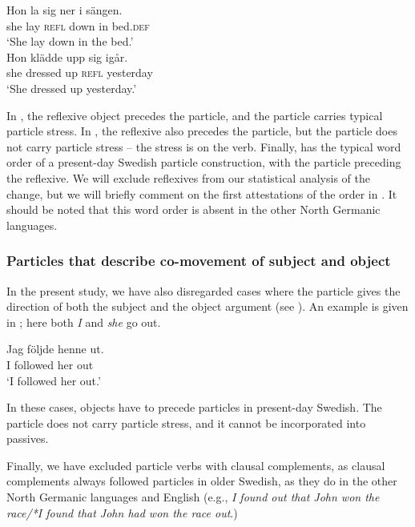 \documentclass[output=paper]{langscibook}
\begin{document}
\ex\label{ex:lalu:19b}
\gll  Hon   la     sig ner     i   sängen.\\
    she     lay   \textsc{refl}   down   in   bed.\textsc{def}\\
  \glt `She lay down in the bed.’ \\
\ex\label{ex:lalu:19c}
\gll Hon   klädde   upp   sig   igår. \\
    she     dressed   up   \textsc{refl}   yesterday\\
\glt `She dressed up yesterday.’\\
\z
\z


In , the reflexive object precedes the particle, and the particle carries typical particle stress. In , the reflexive also precedes the particle, but the particle does not carry particle stress – the stress is on the verb. Finally,  has the typical word order of a present-day Swedish particle construction, with the particle preceding the reflexive. We will exclude reflexives from our statistical analysis of the change, but we will briefly comment on the first attestations of the order in . It should be noted that this word order is absent in the other North Germanic languages.



\subsubsection{Particles that describe co-movement of subject and object} 
In the present study, we have also disregarded cases where the particle gives the direction of both the subject and the object argument (see \citealt{Toivonen2003}). An example is given in ; here both \textit{I} and \textit{she} go out.


\ea\label{ex:lalu:20}
\gll  Jag     följde     henne   ut.\\
I         followed   her     out\\
\glt `I followed her out.'
\z


In these cases, objects have to precede particles in present-day Swedish. The particle does not carry particle stress, and it cannot be incorporated into passives.



Finally, we have excluded particle verbs with clausal complements, as clausal complements always followed particles in older Swedish, as they do in the other North Germanic languages and English (e.g., \textit{I found out that John won the race/*I found that John had won the race out}.)
\end{document}
